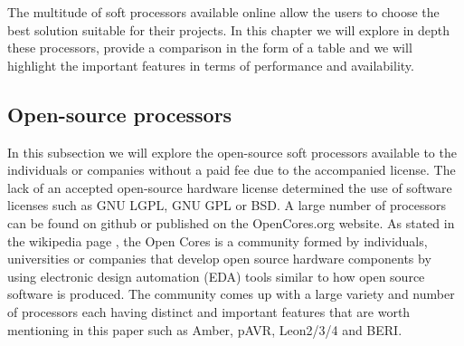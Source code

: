 \hspace{0.5cm} The multitude of soft processors available online allow the users to choose the best
solution suitable for their projects. In this chapter we will explore in depth these processors,
provide a comparison in the form of a table and we will highlight the important features in
terms of performance and availability.

\subsection{Open-source processors}

\hspace{0.5cm} In this subsection we will explore the open-source soft processors available to the
individuals or companies without a paid fee due to the accompanied license. The lack of an
accepted open-source hardware license determined the use of software licenses such as GNU
LGPL, GNU GPL or BSD. A large number of processors can be found on github or published 
on the OpenCores.org website. As stated in the wikipedia page \cite{OpenCores}, the Open Cores is a
community formed by individuals, universities or companies that develop open source
hardware components by using electronic design automation (EDA) tools similar to how
open source software is produced. The community comes up with a large variety and number
of processors each having distinct and important features that are worth mentioning in this
paper such as Amber, pAVR, Leon2/3/4 and BERI.

